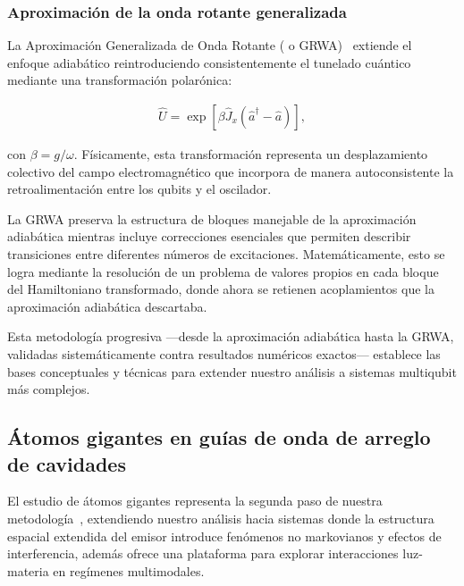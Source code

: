 \documentclass[onecolumn,notitlepage,letterpaper,aps,pra,12pt]{article}
\numberwithin{equation}{section}
\begin{document}
\subsubsection{Aproximación de la onda rotante generalizada}

La Aproximación Generalizada de Onda Rotante ( o GRWA)~\cite{irish2007,albert2011,yu2012,zhang2015,zhangyu2016,zhangyu2017}  extiende el enfoque adiabático reintroduciendo consistentemente el tunelado cuántico mediante una transformación polarónica:

\begin{gather}\label{transformation beta}
    \hat{U} = \exp\left[ \beta\hat{J}_{x}(\hat{a}^{\dagger} - \hat{a}) \right],
\end{gather}

con $\beta = g/\omega$. Físicamente, esta transformación representa un desplazamiento colectivo del campo electromagnético que incorpora de manera autoconsistente la retroalimentación entre los qubits y el oscilador.

La GRWA  preserva la estructura de bloques manejable de la aproximación adiabática mientras incluye correcciones esenciales que permiten describir transiciones entre diferentes números de excitaciones. Matemáticamente, esto se logra mediante la resolución de un problema de valores propios en cada bloque del Hamiltoniano transformado, donde ahora se retienen acoplamientos  que la aproximación adiabática descartaba.

Esta metodología progresiva —desde la aproximación adiabática  hasta la GRWA, validadas sistemáticamente contra resultados numéricos exactos— establece las bases conceptuales y técnicas para extender nuestro análisis a sistemas multiqubit más complejos.


\subsection{Átomos gigantes en guías de onda de arreglo de cavidades}

El estudio de átomos gigantes representa la segunda paso de nuestra metodología~\cite{gonzalez2025}, extendiendo nuestro análisis hacia sistemas donde la estructura espacial extendida del emisor introduce fenómenos no markovianos y efectos de interferencia, además ofrece una plataforma para explorar interacciones luz-materia en regímenes multimodales.
\end{document}
